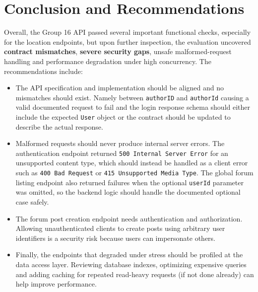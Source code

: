 \section{Conclusion and Recommendations}

Overall, the Group 16 API passed several important functional checks, especially for the location endpoints, but upon further inspection, the evaluation uncovered \textbf{contract mismatches}, \textbf{severe security gaps}, unsafe malformed-request handling and performance degradation under high concurrency. The recommendations include:

\begin{itemize}
    \item The API specification and implementation should be aligned and no mismatches should exist. Namely between \texttt{authorID} and \texttt{authorId} causing a valid documented request to fail and the login response schema should either include the expected \texttt{User} object or the contract should be updated to describe the actual response.
    \item Malformed requests should never produce internal server errors. The authentication endpoint returned \texttt{500 Internal Server Error} for an unsupported content type, which should instead be handled as a client error such as \texttt{400 Bad Request} or \texttt{415 Unsupported Media Type}. The global forum listing endpoint also returned failures when the optional \texttt{userId} parameter was omitted, so the backend logic should handle the documented optional case safely.
    \item The forum post creation endpoint needs authentication and authorization. Allowing unauthenticated clients to create posts using arbitrary user identifiers is a security risk because users can impersonate others.
    \item Finally, the endpoints that degraded under stress should be profiled at the data access layer. Reviewing database indexes, optimizing expensive queries and adding caching for repeated read-heavy requests (if not done already) can help improve performance.
\end{itemize}
